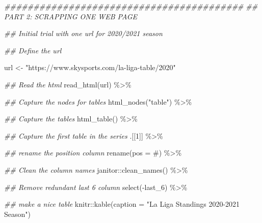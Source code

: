 \documentclass[]{tufte-handout}
\newenvironment{Shaded}{}{}
\newcommand{\AttributeTok}[1]{\textcolor[rgb]{0.49,0.56,0.16}{#1}}
\newcommand{\DecValTok}[1]{\textcolor[rgb]{0.25,0.63,0.44}{#1}}
\newcommand{\DocumentationTok}[1]{\textcolor[rgb]{0.73,0.13,0.13}{\textit{#1}}}
\newcommand{\FunctionTok}[1]{\textcolor[rgb]{0.02,0.16,0.49}{#1}}
\newcommand{\NormalTok}[1]{#1}
\newcommand{\OtherTok}[1]{\textcolor[rgb]{0.00,0.44,0.13}{#1}}
\newcommand{\SpecialCharTok}[1]{\textcolor[rgb]{0.25,0.44,0.63}{#1}}
\newcommand{\StringTok}[1]{\textcolor[rgb]{0.25,0.44,0.63}{#1}}
\begin{document}
\begin{Shaded}
\begin{Highlighting}[]
\DocumentationTok{\#\#\#\#\#\#\#\#\#\#\#\#\#\#\#\#\#\#\#\#\#\#\#\#\#\#\#\#\#\#\#\#\#\#\#\#\#\#\#\#\#}
\DocumentationTok{\#\# PART 2: SCRAPPING ONE WEB PAGE}

\DocumentationTok{\#\# Initial trial with one url for 2020/2021 season}

\DocumentationTok{\#\# Define the url}

\NormalTok{url }\OtherTok{\textless{}{-}} \StringTok{"https://www.skysports.com/la{-}liga{-}table/2020"}

\DocumentationTok{\#\# Read the html}
\FunctionTok{read\_html}\NormalTok{(url) }\SpecialCharTok{\%\textgreater{}\%} 
        
        \DocumentationTok{\#\# Capture the nodes for tables}
        \FunctionTok{html\_nodes}\NormalTok{(}\StringTok{"table"}\NormalTok{) }\SpecialCharTok{\%\textgreater{}\%} 
        
        \DocumentationTok{\#\# Capture the tables}
        \FunctionTok{html\_table}\NormalTok{() }\SpecialCharTok{\%\textgreater{}\%} 
        
        \DocumentationTok{\#\# Capture the first table in the series}
\NormalTok{        .[[}\DecValTok{1}\NormalTok{]] }\SpecialCharTok{\%\textgreater{}\%}
        
        \DocumentationTok{\#\# rename the position column}
        \FunctionTok{rename}\NormalTok{(}\AttributeTok{pos =} \StringTok{\textasciigrave{}}\AttributeTok{\#}\StringTok{\textasciigrave{}}\NormalTok{) }\SpecialCharTok{\%\textgreater{}\%} 
        
        \DocumentationTok{\#\# Clean the column names }
\NormalTok{        janitor}\SpecialCharTok{::}\FunctionTok{clean\_names}\NormalTok{() }\SpecialCharTok{\%\textgreater{}\%} 
        
        \DocumentationTok{\#\# Remove redundant last 6 column}
        \FunctionTok{select}\NormalTok{(}\SpecialCharTok{{-}}\NormalTok{last\_6) }\SpecialCharTok{\%\textgreater{}\%} 
        
        \DocumentationTok{\#\# make a nice table}
\NormalTok{        knitr}\SpecialCharTok{::}\FunctionTok{kable}\NormalTok{(}\AttributeTok{caption =} \StringTok{"La Liga Standings 2020{-}2021 Season"}\NormalTok{)}
\end{Highlighting}
\end{Shaded}
\end{document}
